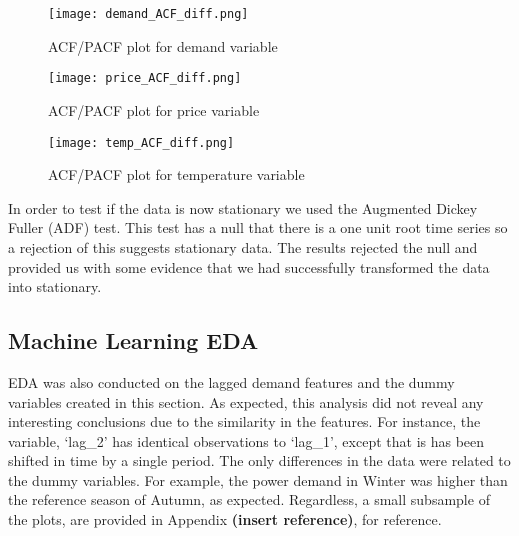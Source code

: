 \documentclass[11pt]{article}
\begin{document}
\begin{figure}[H]
\centering
\begin{minipage}{.9\textwidth}
  \centering
  \texttt{[image: demand\_ACF\_diff.png]}
   \caption{ACF/PACF plot for demand variable}
   \label{fig:demand_PCF_diff}
\end{minipage}%
\end{figure}

\begin{figure}[H]
\centering
\begin{minipage}{.9\textwidth}
  \centering
  \texttt{[image: price\_ACF\_diff.png]}
   \caption{ACF/PACF plot for price variable}
   \label{fig:price_PCF_diff}
\end{minipage}%
\end{figure}

\begin{figure}[H]
\centering
\begin{minipage}{.9\textwidth}
  \centering
  \texttt{[image: temp\_ACF\_diff.png]}
   \caption{ACF/PACF plot for temperature variable}
   \label{fig:temp_PCF_diff}
\end{minipage}%
\end{figure}

\noindent In order to test if the data is now stationary we used the Augmented Dickey Fuller (ADF) test. This test has a null that there is a one unit root time series so a rejection of this suggests stationary data. The results rejected the null and provided us with some evidence that we had successfully transformed the data into stationary.

\subsection{Machine Learning EDA}
\label{section:machine_learning_eda}

EDA was also conducted on the lagged demand features and the dummy variables created in this section. As expected, this analysis did not reveal any interesting conclusions due to the similarity in the features. For instance, the variable, `lag\_2' has identical observations to `lag\_1', except that is has been shifted in time by a single period. The only differences in the data were related to the dummy variables. For example, the power demand in Winter was higher than the reference season of Autumn, as expected. Regardless, a small subsample of the plots, are provided in Appendix \textbf{(insert reference)}, for reference.
\end{document}
